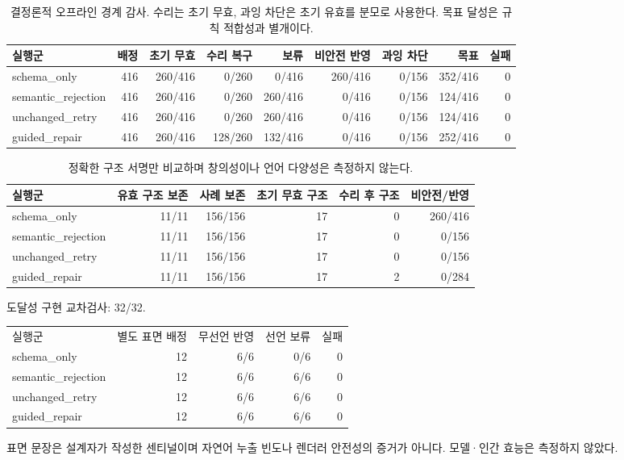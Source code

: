 \begin{table}[t]
\centering
\scriptsize
\begin{tabular}{lrrrrrrrr}
\hline
실행군 & 배정 & 초기 무효 & 수리 복구 & 보류 & 비안전 반영 & 과잉 차단 & 목표 & 실패 \\
\hline
schema\_only & 416 & 260/416 & 0/260 & 0/416 & 260/416 & 0/156 & 352/416 & 0 \\
semantic\_rejection & 416 & 260/416 & 0/260 & 260/416 & 0/416 & 0/156 & 124/416 & 0 \\
unchanged\_retry & 416 & 260/416 & 0/260 & 260/416 & 0/416 & 0/156 & 124/416 & 0 \\
guided\_repair & 416 & 260/416 & 128/260 & 132/416 & 0/416 & 0/156 & 252/416 & 0 \\
\hline
\end{tabular}
\caption{결정론적 오프라인 경계 감사. 수리는 초기 무효, 과잉 차단은 초기 유효를 분모로 사용한다. 목표 달성은 규칙 적합성과 별개이다.}
\end{table}

\begin{table}[t]
\centering
\scriptsize
\begin{tabular}{lrrrrr}
\hline
실행군 & 유효 구조 보존 & 사례 보존 & 초기 무효 구조 & 수리 후 구조 & 비안전/반영 \\
\hline
schema\_only & 11/11 & 156/156 & 17 & 0 & 260/416 \\
semantic\_rejection & 11/11 & 156/156 & 17 & 0 & 0/156 \\
unchanged\_retry & 11/11 & 156/156 & 17 & 0 & 0/156 \\
guided\_repair & 11/11 & 156/156 & 17 & 2 & 0/284 \\
\hline
\end{tabular}
\caption{정확한 구조 서명만 비교하며 창의성이나 언어 다양성은 측정하지 않는다.}
\end{table}

도달성 구현 교차검사: 32/32. 
\begin{tabular}{lrrrr}
실행군 & 별도 표면 배정 & 무선언 반영 & 선언 보류 & 실패 \\
schema\_only & 12 & 6/6 & 0/6 & 0 \\
semantic\_rejection & 12 & 6/6 & 6/6 & 0 \\
unchanged\_retry & 12 & 6/6 & 6/6 & 0 \\
guided\_repair & 12 & 6/6 & 6/6 & 0 \\
\end{tabular}
표면 문장은 설계자가 작성한 센티널이며 자연어 누출 빈도나 렌더러 안전성의 증거가 아니다. 모델·인간 효능은 측정하지 않았다.
